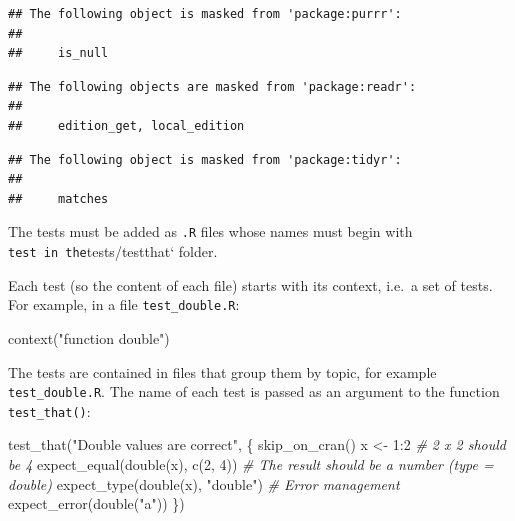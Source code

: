 \documentclass[
  12pt,
  american,
  a4paper,
  extrafontsizes,onecolumn,openright
  ]{memoir}
\newenvironment{Shaded}{\begin{snugshade}}{\end{snugshade}}
\newcommand{\CommentTok}[1]{\textcolor[rgb]{0.56,0.35,0.01}{\textit{#1}}}
\newcommand{\DecValTok}[1]{\textcolor[rgb]{0.00,0.00,0.81}{#1}}
\newcommand{\FunctionTok}[1]{\textcolor[rgb]{0.00,0.00,0.00}{#1}}
\newcommand{\NormalTok}[1]{#1}
\newcommand{\OtherTok}[1]{\textcolor[rgb]{0.56,0.35,0.01}{#1}}
\newcommand{\SpecialCharTok}[1]{\textcolor[rgb]{0.00,0.00,0.00}{#1}}
\newcommand{\StringTok}[1]{\textcolor[rgb]{0.31,0.60,0.02}{#1}}
\begin{document}
\begin{verbatim}
## The following object is masked from 'package:purrr':
## 
##     is_null
\end{verbatim}

\begin{verbatim}
## The following objects are masked from 'package:readr':
## 
##     edition_get, local_edition
\end{verbatim}

\begin{verbatim}
## The following object is masked from 'package:tidyr':
## 
##     matches
\end{verbatim}

\normalsize

The tests must be added as \texttt{.R} files whose names must begin with \texttt{test\textquotesingle{}\ in\ the}tests/testthat` folder.

Each test (so the content of each file) starts with its context, i.e.~a set of tests. For example, in a file \texttt{test\_double.R}:

\scriptsize

\begin{Shaded}
\begin{Highlighting}[]
\FunctionTok{context}\NormalTok{(}\StringTok{"function double"}\NormalTok{)}
\end{Highlighting}
\end{Shaded}

\normalsize

The tests are contained in files that group them by topic, for example \texttt{test\_double.R}.
The name of each test is passed as an argument to the function \texttt{test\_that()}:

\scriptsize

\begin{Shaded}
\begin{Highlighting}[]
\FunctionTok{test\_that}\NormalTok{(}\StringTok{"Double values are correct"}\NormalTok{, \{}
    \FunctionTok{skip\_on\_cran}\NormalTok{()}
\NormalTok{    x }\OtherTok{\textless{}{-}} \DecValTok{1}\SpecialCharTok{:}\DecValTok{2}
    \CommentTok{\# 2 x 2 should be 4}
    \FunctionTok{expect\_equal}\NormalTok{(}\FunctionTok{double}\NormalTok{(x), }\FunctionTok{c}\NormalTok{(}\DecValTok{2}\NormalTok{, }\DecValTok{4}\NormalTok{))}
    \CommentTok{\# The result should be a number (type = \textquotesingle{}double\textquotesingle{})}
    \FunctionTok{expect\_type}\NormalTok{(}\FunctionTok{double}\NormalTok{(x), }\StringTok{"double"}\NormalTok{)}
    \CommentTok{\# Error management}
    \FunctionTok{expect\_error}\NormalTok{(}\FunctionTok{double}\NormalTok{(}\StringTok{"a"}\NormalTok{))}
\NormalTok{\})}
\end{Highlighting}
\end{Shaded}
\end{document}
